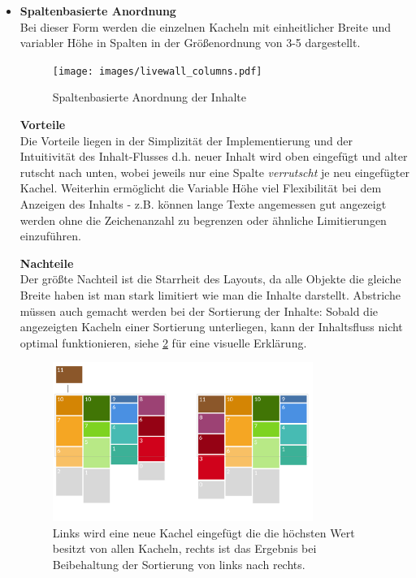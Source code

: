 \documentclass[12pt,twoside]{book}
\begin{document}
\begin{itemize}
  \item \textbf{Spaltenbasierte Anordnung} \\
  Bei dieser Form werden die einzelnen Kacheln mit einheitlicher Breite und variabler Höhe in Spalten in der Größenordnung von 3-5 dargestellt.

  \begin{figure}[H]
    \centering
    \texttt{[image: images/livewall\_columns.pdf]}
    \caption{Spaltenbasierte Anordnung der Inhalte}
    \label{fig:awesome_image}
  \end{figure}

  \textbf{Vorteile} \\
  Die Vorteile liegen in der Simplizität der Implementierung und der Intuitivität des Inhalt-Flusses d.h. neuer Inhalt wird oben eingefügt und alter rutscht nach unten, wobei jeweils nur eine Spalte \textit{verrutscht} je neu eingefügter Kachel.
  Weiterhin ermöglicht die Variable Höhe viel Flexibilität bei dem Anzeigen des Inhalts - z.B. können lange Texte angemessen gut angezeigt werden ohne die Zeichenanzahl zu begrenzen oder ähnliche Limitierungen einzuführen.

  \textbf{Nachteile}\\
  Der größte Nachteil ist die Starrheit des Layouts, da alle Objekte die gleiche Breite haben ist man stark limitiert wie man die Inhalte darstellt. Abstriche müssen auch gemacht werden bei der Sortierung der Inhalte: Sobald die angezeigten Kacheln einer Sortierung unterliegen, kann der Inhaltsfluss nicht optimal funktionieren, siehe \ref{fig:livewall_sort} für eine visuelle Erklärung.
  
  \begin{figure}[H]
    \centering
    \includegraphics[width=0.8\textwidth]{images/livewall_sort.png}
    \caption{Links wird eine neue Kachel eingefügt die die höchsten Wert besitzt von allen Kacheln, rechts ist das Ergebnis bei Beibehaltung der Sortierung von links nach rechts.}
    \label{fig:livewall_sort}
  \end{figure}
  

\end{itemize}
\end{document}
